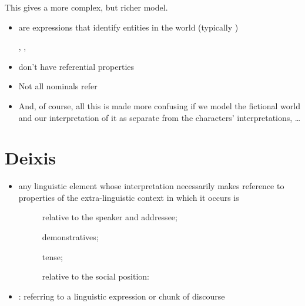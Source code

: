 \documentclass[a4paper,landscape,headrule,footrule,xetex]{foils}
\begin{document}
This gives a more complex, but richer model.



\begin{itemize}
\item {} are expressions that identify
  entities in the world (typically )
  \begin{exe}
    \ex {}, 
    \ex {}, 
  \end{exe}
\item {} don't have referential properties
  \begin{exe}
    \ex {}
  \end{exe}
\item Not all nominals refer
  \begin{exe}
    \ex {}
    \ex {}
  \end{exe}
\item And, of course, all this is made more confusing if we model the
  fictional world and our interpretation of it as separate from the
  characters' interpretations, \ldots
\end{itemize}


\section{Deixis}


\begin{itemize}
\item any linguistic element whose interpretation
  necessarily makes reference to properties of the
  extra-linguistic context in which it occurs is 
  \begin{description}
  \item[] relative to the speaker and addressee; 
  \item[] demonstratives; 
  \item[] tense; 
  \item[] relative to the social position: 
  \end{description}
\item {}: referring to a linguistic expression or chunk of discourse
\end{itemize}
\end{document}
